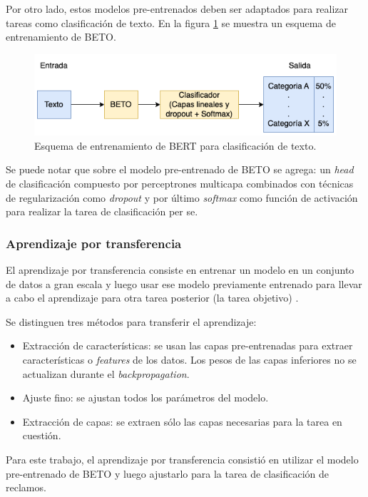 Por otro lado, estos modelos pre-entrenados deben ser adaptados para realizar tareas como clasificación de texto. En la figura \ref{fig:cap3-downstream} se muestra un esquema de entrenamiento de BETO.

\begin{figure}[htbp]
	\centering
	\includegraphics[width=.9\textwidth]{./Figures/cap3-downstream.png}
	\caption{Esquema de entrenamiento de BERT para clasificación de texto.}
	\label{fig:cap3-downstream}
\end{figure}

Se puede notar que sobre el modelo pre-entrenado de BETO se agrega: un \textit{head} de clasificación compuesto por perceptrones multicapa combinados con técnicas de regularización como \textit{dropout} y por último \textit{softmax} como función de activación para realizar la tarea de clasificación per se.

\subsubsection{Aprendizaje por transferencia}
\label{section:tf}

El aprendizaje por transferencia consiste en entrenar un modelo en un conjunto de datos a gran escala y luego usar ese modelo previamente entrenado para llevar a cabo el aprendizaje para otra tarea posterior (la tarea objetivo) \citep{WEBSITE:24}.

Se distinguen tres métodos para transferir el aprendizaje:
\begin{itemize}
	\item Extracción de características: se usan las capas pre-entrenadas para extraer características o \textit{features} de los datos. Los pesos de las capas inferiores no se actualizan durante el \textit{backpropagation}.
	\item Ajuste fino: se ajustan todos los parámetros del modelo.
	\item Extracción de capas: se extraen sólo las capas necesarias para la tarea en cuestión.
\end{itemize}

Para este trabajo, el aprendizaje por transferencia consistió en utilizar el modelo pre-entrenado de BETO y luego ajustarlo para la tarea de clasificación de reclamos.

